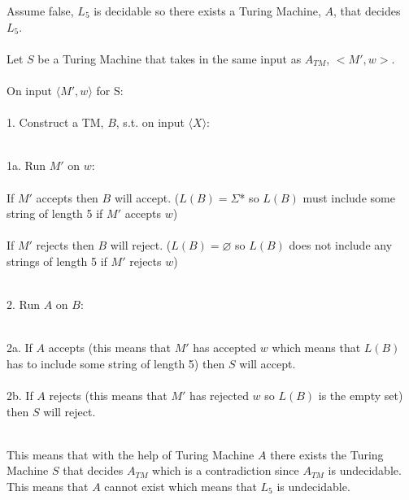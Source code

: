 \documentclass[11pt]{article}
\theoremstyle{definition}
\theoremstyle{theorem}
\newcommand{\solution}{\medskip\noindent{\color{blue}\textbf{Solution:}}}
\begin{document}
\solution

\noindent Assume false, $L_{5}$ is decidable so there exists a Turing Machine, $A$, that decides $L_{5}$. \\~\\
\noindent Let $S$ be a Turing Machine that takes in the same input as $A_{TM}$, $<M', w>$. \\~\\
\noindent On input $\langle M', w \rangle$ for S: \\~\\
\hangindent=0.7cm 1. Construct a TM, $B$, s.t. on input $\langle X \rangle$: \\~\\
\hspace*{0.9cm}
\begin{minipage}{.8\textwidth}
		1a. Run $M'$ on $w$: \\~\\
		\indent If $M'$ accepts then $B$ will accept. ($L(B) = \Sigma$* so $L(B)$ must include some string of length 5 if $M'$ accepts $w$)  \\~\\
		\indent If $M'$ rejects then $B$ will reject. ($L(B) = \varnothing$ so $L(B)$ does not include any strings of length 5 if $M'$ rejects $w$) \\~\\
\end{minipage}

2. Run $A$ on $B$: \\~\\
\hspace*{0.9cm}
\begin{minipage}{.8\textwidth}
2a. If $A$ accepts (this means that $M'$ has accepted $w$ which means that $L(B)$ has to include some string of length 5) then $S$ will accept. \\~\\
2b. If $A$ rejects (this means that $M'$ has rejected $w$ so $L(B)$ is the empty set) then $S$ will reject. \\~\\
\end{minipage}

\noindent This means that with the help of Turing Machine $A$ there exists the Turing Machine $S$ that decides $A_{TM}$ which is a contradiction since $A_{TM}$ is undecidable. This means that $A$ cannot exist which means that $L_5$ is undecidable.




\newpage
\end{document}
